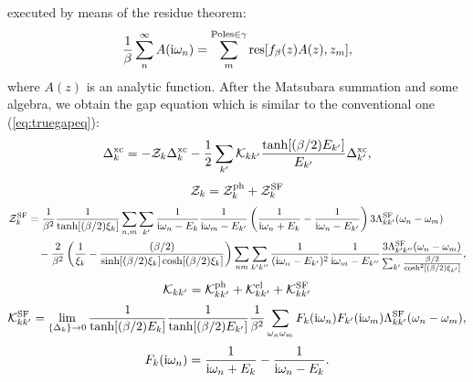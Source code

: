 executed by means of the residue theorem:
%
\begin{equation}
	\frac{1}{\beta} \sum_{n}^{\infty}A({\rm i}\omega_n) = 
	\sum_{m}^{{\rm Poles} \in \gamma} {\rm res}[f_{\beta}(z)A(z),z_{m}],
	\label{eq:residue}
\end{equation}
%
where $A(z)$ is an analytic function. After the Matsubara summation and some algebra, we obtain
the gap equation which is similar to the conventional one (\ref{eq:truegapeq}):
%
\begin{equation}
	\Delta^{\rm xc}_{k} = -{\mathcal Z}_{k}\Delta^{\rm xc}_{k} - \frac{1}{2}
	\sum_{k'} {\mathcal K}_{kk'} \frac{\tanh[(\beta/2)E_{k'}]}
	{E_{k'}} \Delta^{\rm xc}_{k'},
	\label{eq:aftergapeq}
\end{equation}
%
\begin{equation}
	\mathcal Z_{k} = \mathcal Z^{\rm ph}_{k} + \mathcal Z^{\rm SF}_{k} 
	\label{eq:Zsum}
\end{equation}
%
\begin{equation}
	\begin{split}
		\mathcal Z^{\rm SF}_{k} &= \frac{1}{\beta^2}\frac{1}{\tanh[(\beta/2)\xi_{k}]} 
	\sum_{n,m}\sum_{k'}\frac{1}{{\rm i}\omega_n - E_k}\frac{1}{{\rm i}\omega_m - E_{k'}}
	\left(\frac{1}{{\rm i}\omega_n + E_k} - \frac{1}{ {\rm i}\omega_n - E_{k'}} \right)3\Lambda^{\rm SF}_{kk'}(\omega_n - \omega_m) \\
	&\quad - \frac{2}{\beta^2}\left(\frac{1}{\xi_k} - \frac{(\beta/2)}{\sinh[(\beta/2)\xi_k]\cosh[(\beta/2)\xi_k]} \right)
	\sum_{nm}\sum_{k'k''} \frac{1}{({\rm i}\omega_n - E_{k'})^2} \frac{1}{ {\rm i}\omega_m - E_{k''}}
	\frac{3\Lambda^{\rm SF}_{k'k''}(\omega_n - \omega_m)}{\sum_{k'}\frac{\beta/2}{\cosh^2\left[(\beta/2)\xi_{k'}\right]}} ,
	\label{eq:ZSFdef}
\end{split}
\end{equation}
%
\begin{equation}
	\mathcal K_{kk'} = \mathcal K^{\rm ph}_{kk'} + \mathcal K^{\rm el}_{kk'} + \mathcal K^{\rm SF}_{kk'}
	\label{eq:Ksum}
\end{equation}
%
\begin{equation}
	{\mathcal K}^{\rm SF}_{kk'} = 
	\lim_{\{\Delta_{k}\} \to 0}
	\frac{1}{\tanh[(\beta/2)E_{k}]}\frac{1}{\tanh[(\beta/2)E_{k'}]}
	\frac{1}{\beta^2}
	\sum_{\omega_n\omega_m}
	F_{k}({\rm i}\omega_n)F_{k'}({\rm i}\omega_m)
	\Lambda^{\rm SF}_{kk'}(\omega_n - \omega_m),
	\label{eq:KSFdef}
\end{equation}
%
\begin{equation}
	F_{k}({\rm i}\omega_n) = \frac{1}{ {\rm i}\omega_n + E_{k}} - 
	\frac{1}{ {\rm i}\omega_n - E_{k}}.
	\label{eq:Fkdef}
\end{equation}
